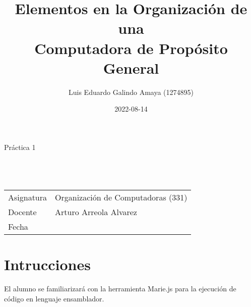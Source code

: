 \documentclass[12pt]{article}
\author{Luis Eduardo Galindo Amaya (1274895)}
\date{2022-08-14}
\title{Elementos en la Organización de una \\
Computadora de Propósito General}
\begin{document}
\newenvironment{code}
{
\VerbatimEnvironment
\begin{Verbatim}[numbers=left, frame=leftline, framesep=5mm] %
}
{
\end{Verbatim} %
\pagebreak
}

\newcommand{\miportada}[1]{
	\begin{titlepage}
		\vspace*{0.75in}
		\begin{flushleft}
			\sffamily
			\large #1 \\
			\Huge \@title \\
			\hrulefill
			\vspace{0.25in} \\
			\Large \@author \\
			\vspace*{\fill}
			\large
			\begin{tabular}{ |l|l| }
				\hline
				Asignatura & Organización de Computadoras (331) \\
				Docente    & Arturo Arreola Alvarez             \\
				Fecha      & \@date                             \\
				\hline
			\end{tabular}
		\end{flushleft}
	\end{titlepage}
}

\miportada{ Práctica 1 }
\tableofcontents

\section{Intrucciones}
\label{sec:orga94cd47}
El alumno se familiarizará con la herramienta Marie.js para la ejecución de código en lenguaje ensamblador.
\end{document}
